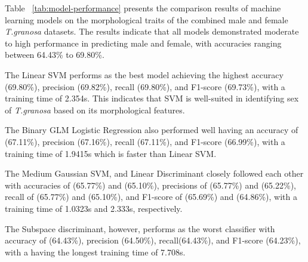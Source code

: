 \begin{table}[H]
	\centering
	\caption{Model Performance Comparison}
	\label{tab:model-performance}
\end{table}

Table ~\ref{tab:model-performance} presents the comparison results of machine learning models on the morphological traits of the combined  male and female \textit{T.granosa} datasets. The results indicate that all models demonstrated moderate to high performance in predicting male and female, with accuracies ranging between 64.43\% to 69.80\%. 

The Linear SVM performs as the best model achieving the highest accuracy (69.80\%), precision (69.82\%), recall (69.80\%), and F1-score (69.73\%), with a training time of 2.354s. This indicates that SVM is well-suited in identifying sex of \textit{T.granosa} based on its morphological features. 

The Binary GLM Logistic Regression also performed well having an accuracy of (67.11\%), precision (67.16\%), recall (67.11\%), and F1-score (66.99\%), with a training time of 1.9415s which is faster than Linear SVM. 

The Medium Gaussian SVM, and Linear Discriminant closely followed each other with accuracies of (65.77\%) and (65.10\%), precisions of (65.77\%) and (65.22\%), recall of (65.77\%) and (65.10\%), and F1-score of (65.69\%) and (64.86\%), with a training time of 1.0323s and 2.333s, respectively. 

The Subspace discriminant, however, performs as the worst classifier with accuracy of (64.43\%), precision (64.50\%), recall(64.43\%), and F1-score (64.23\%), with a having the longest training time of 7.708s. 

